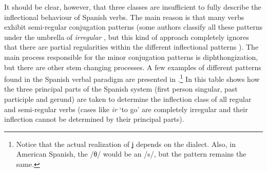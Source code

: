 It should be clear, however, that three classes are insufficient to fully describe the inflectional behaviour of Spanish verbs. The main reason is that many verbs exhibit semi-regular conjugation patterns (some authors classify all these patterns under the umbrella of \textit{irregular} \citealt{Brovetto.2005}, but this kind of approach completely ignores that there are partial regularities within the different inflectional patterns \citealt{Maiden.2001, Maiden.2005}).  
The main process responsible for the minor conjugation patterns is diphthongization, but there are other stem changing processes. A few examples of different patterns found in the Spanish verbal paradigm are presented in .\footnote{Notice that the actual realization of ʝ depends on the dialect. Also, in American Spanish, the /θ/ would be an /s/, but the pattern remains the same.} In this table shows how the three principal parts of the Spanish system (first person singular, past participle and gerund) are taken to determine the inflection class of all regular and semi-regular verbs (cases like \textit{ir} `to go' are completely irregular and their inflection cannot be determined by their principal parts).


